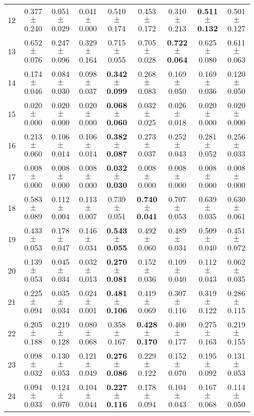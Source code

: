 \begin{table}[!ht]
{\begin{tabular}{r c c c c c c c c}
12 & 0.377 $\pm$ 0.240 & 0.051 $\pm$ 0.029 & 0.041 $\pm$ 0.000 & 0.510 $\pm$ 0.174 & 0.453 $\pm$ 0.172 & 0.310 $\pm$ 0.213 & \textbf{0.511 $\pm$ 0.132} & 0.501 $\pm$ 0.127 \\
13 & 0.652 $\pm$ 0.076 & 0.247 $\pm$ 0.096 & 0.329 $\pm$ 0.164 & 0.715 $\pm$ 0.055 & 0.705 $\pm$ 0.028 & \textbf{0.722 $\pm$ 0.064} & 0.625 $\pm$ 0.080 & 0.611 $\pm$ 0.063 \\
14 & 0.174 $\pm$ 0.046 & 0.084 $\pm$ 0.030 & 0.098 $\pm$ 0.037 & \textbf{0.342 $\pm$ 0.099} & 0.268 $\pm$ 0.083 & 0.169 $\pm$ 0.050 & 0.169 $\pm$ 0.036 & 0.120 $\pm$ 0.050 \\
15 & 0.020 $\pm$ 0.000 & 0.020 $\pm$ 0.000 & 0.020 $\pm$ 0.000 & \textbf{0.068 $\pm$ 0.060} & 0.032 $\pm$ 0.025 & 0.026 $\pm$ 0.018 & 0.020 $\pm$ 0.000 & 0.020 $\pm$ 0.000 \\
16 & 0.213 $\pm$ 0.060 & 0.106 $\pm$ 0.014 & 0.106 $\pm$ 0.014 & \textbf{0.382 $\pm$ 0.087} & 0.273 $\pm$ 0.037 & 0.252 $\pm$ 0.043 & 0.281 $\pm$ 0.052 & 0.256 $\pm$ 0.033 \\
17 & 0.008 $\pm$ 0.000 & 0.008 $\pm$ 0.000 & 0.008 $\pm$ 0.000 & \textbf{0.032 $\pm$ 0.030} & 0.008 $\pm$ 0.000 & 0.008 $\pm$ 0.000 & 0.008 $\pm$ 0.000 & 0.008 $\pm$ 0.000 \\
18 & 0.583 $\pm$ 0.089 & 0.112 $\pm$ 0.004 & 0.113 $\pm$ 0.007 & 0.739 $\pm$ 0.051 & \textbf{0.740 $\pm$ 0.041} & 0.707 $\pm$ 0.053 & 0.639 $\pm$ 0.035 & 0.630 $\pm$ 0.061 \\
19 & 0.433 $\pm$ 0.053 & 0.178 $\pm$ 0.047 & 0.146 $\pm$ 0.034 & \textbf{0.543 $\pm$ 0.055} & 0.492 $\pm$ 0.060 & 0.489 $\pm$ 0.034 & 0.509 $\pm$ 0.040 & 0.451 $\pm$ 0.072 \\
20 & 0.139 $\pm$ 0.053 & 0.045 $\pm$ 0.034 & 0.032 $\pm$ 0.013 & \textbf{0.270 $\pm$ 0.081} & 0.152 $\pm$ 0.036 & 0.109 $\pm$ 0.040 & 0.112 $\pm$ 0.043 & 0.062 $\pm$ 0.035 \\
21 & 0.225 $\pm$ 0.094 & 0.035 $\pm$ 0.034 & 0.024 $\pm$ 0.001 & \textbf{0.481 $\pm$ 0.106} & 0.419 $\pm$ 0.069 & 0.307 $\pm$ 0.116 & 0.319 $\pm$ 0.122 & 0.286 $\pm$ 0.115 \\
22 & 0.205 $\pm$ 0.188 & 0.219 $\pm$ 0.128 & 0.080 $\pm$ 0.068 & 0.358 $\pm$ 0.167 & \textbf{0.428 $\pm$ 0.170} & 0.400 $\pm$ 0.177 & 0.275 $\pm$ 0.163 & 0.219 $\pm$ 0.155 \\
23 & 0.098 $\pm$ 0.032 & 0.130 $\pm$ 0.053 & 0.121 $\pm$ 0.049 & \textbf{0.276 $\pm$ 0.086} & 0.229 $\pm$ 0.122 & 0.152 $\pm$ 0.070 & 0.195 $\pm$ 0.092 & 0.131 $\pm$ 0.053 \\
24 & 0.094 $\pm$ 0.033 & 0.124 $\pm$ 0.070 & 0.104 $\pm$ 0.044 & \textbf{0.227 $\pm$ 0.116} & 0.178 $\pm$ 0.094 & 0.104 $\pm$ 0.043 & 0.167 $\pm$ 0.068 & 0.114 $\pm$ 0.050 \\

\end{tabular}}
\end{table}
